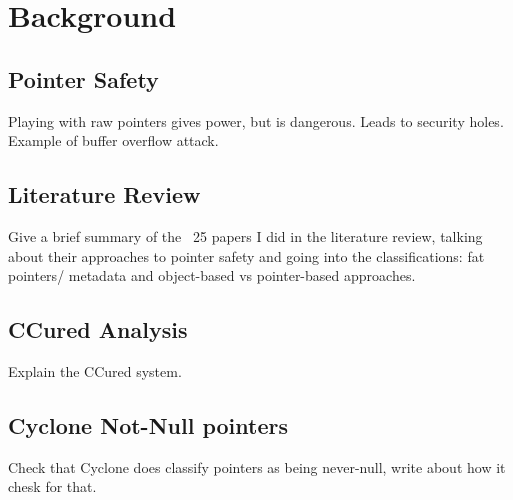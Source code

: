 \chapter{Background}

\section{Pointer Safety}

Playing with raw pointers gives power, but is dangerous. Leads to security holes. Example of buffer overflow attack.

\section{Literature Review}

Give a brief summary of the ~25 papers I did in the literature review, talking about their approaches to pointer safety and going into the classifications: fat pointers/ metadata and object-based vs pointer-based approaches.

\section{CCured Analysis}

Explain the CCured system.

\section{Cyclone Not-Null pointers}

Check that Cyclone does classify pointers as being never-null, write about how it chesk for that.
